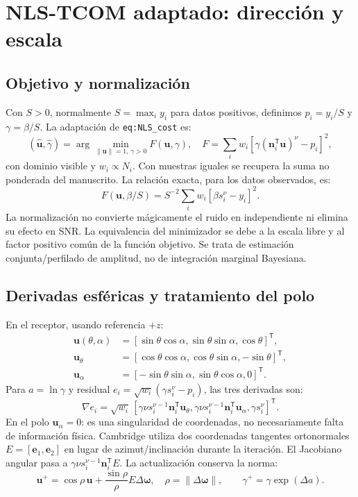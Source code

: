 \documentclass[11pt,a4paper]{article}
\begin{document}
\section{NLS-TCOM adaptado: dirección y escala}
\subsection{Objetivo y normalización}
Con $S>0$, normalmente $S=\max_i y_i$ para datos positivos, definimos $p_i=y_i/S$ y $\gamma=\beta/S$. La adaptación de \texttt{eq:NLS\_cost} es:
\begin{equation}
 (\hat{\mathbf u},\hat\gamma)=\arg\min_{\|\mathbf u\|=1,\,\gamma>0}
 F(\mathbf u,\gamma),\quad
 F=\sum_i w_i\left[\gamma(\mathbf n_i^{\mathsf T}\mathbf u)^\nu-p_i\right]^2,
\label{eq:nls}
\end{equation}
con dominio visible y $w_i\propto N_i$. Con muestras iguales se recupera la suma no ponderada del manuscrito. La relación exacta, para los datos observados, es:
\begin{equation}
 F(\mathbf u,\beta/S)=S^{-2}\sum_iw_i[\beta s_i^\nu-y_i]^2.
\end{equation}
La normalización no convierte mágicamente el ruido en independiente ni elimina su efecto en SNR. La equivalencia del minimizador se debe a la escala libre y al factor positivo común de la función objetivo. Se trata de estimación conjunta/perfilado de amplitud, no de integración marginal Bayesiana.

\subsection{Derivadas esféricas y tratamiento del polo}
En el receptor, usando referencia $+z$:
\begin{align}
 \mathbf u(\theta,\alpha)&=[\sin\theta\cos\alpha,\sin\theta\sin\alpha,\cos\theta]^{\mathsf T},\\
 \mathbf u_\theta&=[\cos\theta\cos\alpha,\cos\theta\sin\alpha,-\sin\theta]^{\mathsf T},\\
 \mathbf u_\alpha&=[-\sin\theta\sin\alpha,\sin\theta\cos\alpha,0]^{\mathsf T}.
\end{align}
Para $a=\ln\gamma$ y residual $e_i=\sqrt{w_i}(\gamma s_i^\nu-p_i)$, las tres derivadas son:
\begin{equation}
 \nabla e_i=\sqrt{w_i}\,[\gamma\nu s_i^{\nu-1}\mathbf n_i^{\mathsf T}\mathbf u_\theta,
 \gamma\nu s_i^{\nu-1}\mathbf n_i^{\mathsf T}\mathbf u_\alpha,\gamma s_i^\nu]^{\mathsf T}.
\end{equation}
En el polo $\mathbf u_\alpha=0$: es una singularidad de coordenadas, no necesariamente falta de información física. Cambridge utiliza dos coordenadas tangentes ortonormales $E=[\mathbf e_1,\mathbf e_2]$ en lugar de azimut/inclinación durante la iteración. El Jacobiano angular pasa a $\gamma\nu s_i^{\nu-1}\mathbf n_i^{\mathsf T}E$. La actualización conserva la norma:
\begin{equation}
 \mathbf u^+=\cos\rho\,\mathbf u+\frac{\sin\rho}{\rho}E\Delta\boldsymbol\omega,\quad
 \rho=\|\Delta\boldsymbol\omega\|,\qquad \gamma^+=\gamma\exp(\Delta a).
\end{equation}
\end{document}
